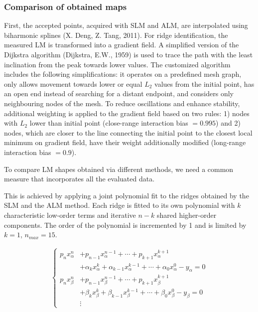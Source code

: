 \documentclass[journal,twoside,web]{ieeecolor2}
\begin{document}
\subsubsection{Comparison of obtained maps}
First, the accepted points, acquired with SLM and ALM, are interpolated using biharmonic splines (X. Deng, Z. Tang, 2011). For ridge identification, the measured LM is transformed into a gradient field. A simplified version of the Dijkstra algorithm (Dijkstra, E.W., 1959) is used to trace the path with the least inclination from the peak towards lower values. The customized algorithm includes the following simplifications: it operates on a predefined mesh graph, only allows movement towards lower or equal $L_2$ values from the initial point, has an open end instead of searching for a distant endpoint, and considers only neighbouring nodes of the mesh. To reduce oscillations and enhance stability, additional weighting is applied to the gradient field based on two rules: 1) nodes with $L_2$ lower than initial point (close-range interaction bias $= 0.995$) and 2) nodes, which are closer to the line connecting the initial point to the closest local minimum on gradient field, have their weight additionally modified (long-range interaction bias $= 0.9$). 

To compare LM shapes obtained via different methods, we need a common measure that incorporates all the evaluated data. 

This is achieved by applying a joint polynomial fit to the ridges obtained by the SLM and the ALM method. Each ridge is fitted to its own polynomial with $k$ characteristic low-order terms and iterative $n-k$ shared higher-order components. The order of the polynomial is incremented by 1 and is limited by $k = 1$, $n_{max} = 15$.


\begin{align}
\begin{cases}
p_{n} x_{\alpha}^n&+p_{n-1} x_{\alpha}^{n-1}+\cdots+p_{k+1} x_{\alpha}^{k+1} \\
&+\alpha_k x_{\alpha}^{k}+\alpha_{k-1} x_{\alpha}^{k-1}+\cdots+\alpha _0 x_{\alpha}^0-y_{\alpha} =0 \\
p_{n} x_{\beta}^n&+p_{n-1} x_{\beta}^{n-1}+\cdots+p_{k+1} x_{\beta}^{k+1} \\
&+\beta_k x_{\beta}^{k}+\beta_{k-1} x_{\beta}^{k-1}+\cdots+\beta _0 x_{\beta}^0-y_{\beta} =0 \\
& \vdots 
\end{cases}
\label{eq1}
\end{align}
\end{document}
